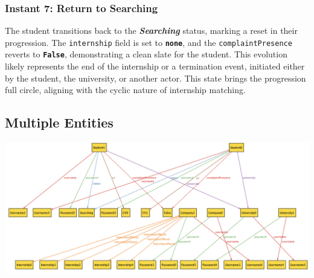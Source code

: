 \subsubsection*{Instant 7: Return to Searching}
The student transitions back to the \textbf{\textit{Searching}} status, marking a reset in their progression. The \texttt{internship} field is set to \textbf{\texttt{none}}, and the \texttt{complaintPresence} reverts to \textbf{\texttt{False}}, demonstrating a clean slate for the student. This evolution likely represents the end of the internship or a termination event, initiated either by the student, the university, or another actor. This state brings the progression full circle, aligning with the cyclic nature of internship matching.

\subsection{Multiple Entities}

\vspace{5mm}
\includegraphics[width=\textwidth]{complex.png}